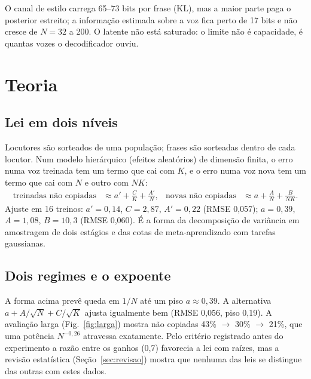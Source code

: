 \documentclass[a4paper,11pt]{article}
\begin{document}
O canal de estilo carrega 65--73 bits por frase (KL), mas a maior parte paga o posterior estreito; a informação estimada sobre a voz fica perto de 17 bits e não cresce de $N=32$ a 200. O latente não está saturado: o limite não é capacidade, é quantas vozes o decodificador ouviu.

\section{Teoria}

\subsection{Lei em dois níveis}

Locutores são sorteados de uma população; frases são sorteadas dentro de cada locutor. Num modelo hierárquico (efeitos aleatórios) de dimensão finita, o erro numa voz treinada tem um termo que cai com $K$, e o erro numa voz nova tem um termo que cai com $N$ e outro com $NK$:
\begin{align*}
\text{treinadas não copiadas} &\approx a' + \frac{C}{K} + \frac{A'}{N}, &
\text{novas não copiadas} &\approx a + \frac{A}{N} + \frac{B}{NK}.
\end{align*}
Ajuste em 16 treinos: $a'=0{,}14$, $C=2{,}87$, $A'=0{,}22$ (RMSE 0,057); $a=0{,}39$, $A=1{,}08$, $B=10{,}3$ (RMSE 0,060). É a forma da decomposição de variância em amostragem de dois estágios e das cotas de meta-aprendizado com tarefas gaussianas.

\subsection{Dois regimes e o expoente}

A forma acima prevê queda em $1/N$ até um piso $a\approx0{,}39$. A alternativa $a + A/\sqrt N + C/\sqrt K$ ajusta igualmente bem (RMSE 0,056, piso 0,19). A avaliação larga (Fig.~\ref{fig:larga}) mostra não copiadas 43\% $\rightarrow$ 30\% $\rightarrow$ 21\%, que uma potência $N^{-0{,}26}$ atravessa exatamente. Pelo critério registrado antes do experimento a razão entre os ganhos (0,7) favorecia a lei com raízes, mas a revisão estatística (Seção~\ref{sec:revisao}) mostra que nenhuma das leis se distingue das outras com estes dados.
\end{document}
